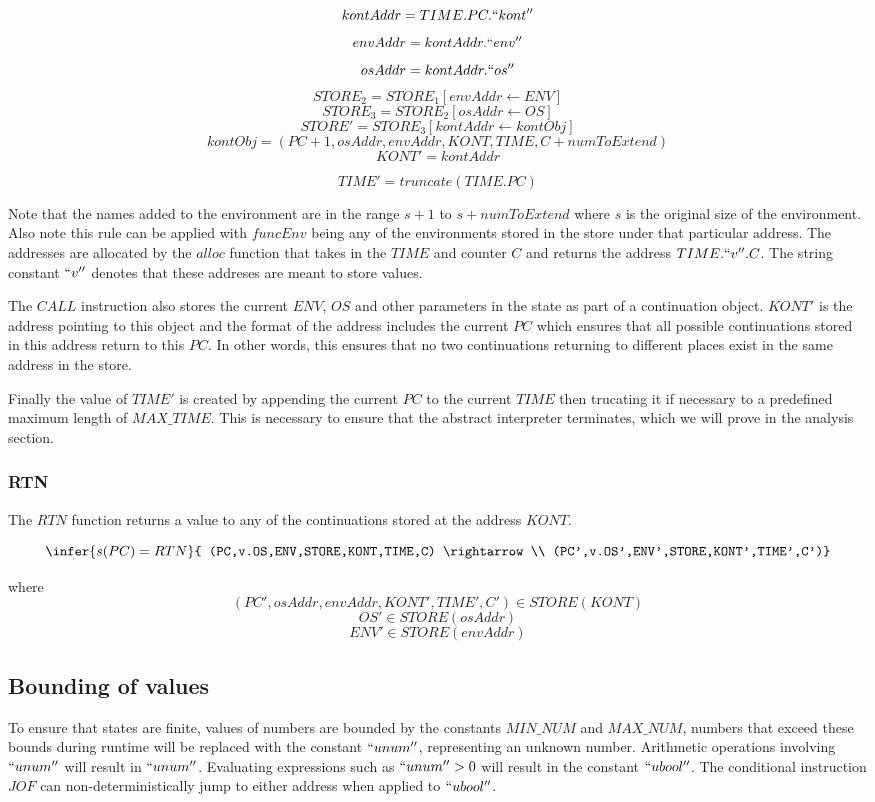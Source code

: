 \documentclass[12pt]{article}
\begin{document}
$$kontAddr = TIME.PC.``kont''$$
$$envAddr = kontAddr.``env''$$
$$osAddr = kontAddr.``os''$$
$$STORE_2=STORE_1[envAddr \leftarrow ENV]$$
$$STORE_3=STORE_2[osAddr \leftarrow OS]$$
$$STORE'=STORE_3[kontAddr \leftarrow kontObj]$$
$$kontObj = (PC+1,osAddr,envAddr,KONT,TIME,C+numToExtend)$$
$$KONT' = kontAddr$$

$$TIME' = truncate(TIME.PC)$$

Note that the names added to the environment are in the range $s+1$ to $s+numToExtend$ where $s$ is the original size of the environment. Also note this rule can be applied with $funcEnv$ being any of the environments stored in the store under that particular address. The addresses are allocated by the $alloc$ function that takes in the $TIME$ and counter $C$ and returns the address $TIME.``v''.C$. The string constant $``v''$ denotes that these addreses are meant to store values.

The $CALL$ instruction also stores the current $ENV$, $OS$ and other parameters in the state as part of a continuation object. $KONT'$ is the address pointing to this object and the format of the address includes the current $PC$ which ensures that all possible continuations stored in this address return to this $PC$. In other words, this ensures that no two continuations returning to different places exist in the same address in the store.

Finally the value of $TIME'$ is created by appending the current $PC$ to the current $TIME$ then trucating it if necessary to a predefined maximum length of $MAX\_TIME$. This is necessary to ensure that the abstract interpreter terminates, which we will prove in the analysis section.

\subsubsection{RTN}
The $RTN$ function returns a value to any of the continuations stored at the address $KONT$.

$$\infer{s(PC) = RTN}{
    (PC,v.OS,ENV,STORE,KONT,TIME,C) \rightarrow \\
    (PC',v.OS',ENV',STORE,KONT',TIME',C')}$$

where
$$(PC',osAddr,envAddr,KONT',TIME',C') \in STORE(KONT)$$
$$OS' \in STORE(osAddr)$$
$$ENV' \in STORE(envAddr)$$

\subsection{Bounding of values}
To ensure that states are finite, values of numbers are bounded by the constants $MIN\_NUM$ and $MAX\_NUM$, numbers that exceed these bounds during runtime will be replaced with the constant $``unum''$, representing an unknown number. Arithmetic operations involving $``unum''$ will result in $``unum''$. Evaluating expressions such as $``unum'' > 0$ will result in the constant $``ubool''$. The conditional instruction $JOF$ can non-deterministically jump to either address when applied to $``ubool''$.
\end{document}
